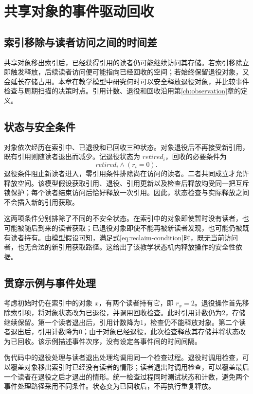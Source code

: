 \chapter{共享对象的事件驱动回收}
\label{ch:reclamation}

\section{索引移除与读者访问之间的时间差}
共享对象移出索引后，已经获得引用的读者仍可能继续访问其存储。若索引移除立即触发释放，后续读者访问便可能指向已经回收的空间；若始终保留退役对象，又会延长存储占用。本章在教学模型中研究何时可以安全释放退役对象，并比较事件检查与周期扫描的决策时点。引用计数、退役和回收沿用第\ref{ch:observation}章的定义。

\section{状态与安全条件}
对象依次经历在索引中、已退役和已回收三种状态。对象退役后不再接受新引用，既有引用则随读者退出而减少。记退役状态为 $retired_i$，回收的必要条件为
\begin{equation}
retired_i \land (r_i=0).
\label{eq:reclaim-condition}
\end{equation}
退役条件阻止新读者进入，零引用条件排除尚在访问的读者。二者共同成立才允许释放空间。该模型假设获取引用、退役、引用更新以及检查后释放均受同一把互斥锁保护；每个读者结束访问后恰好释放一次引用。因此，状态检查与实际释放之间不会插入新的引用获取。

这两项条件分别排除了不同的不安全状态。在索引中的对象即使暂时没有读者，也可能被随后到来的读者获取；已退役对象即使不能再被新读者发现，也可能仍被既有读者持有。由模型假设可知，满足式\ref{eq:reclaim-condition}时，既无当前访问者，也无合法的新引用获取路径。这给出了该教学状态机内释放操作的安全性依据。

\section{贯穿示例与事件处理}
考虑初始时仍在索引中的对象 $x$，有两个读者持有它，即 $r_x=2$。退役操作首先移除索引项，将对象状态改为已退役，并调用回收检查。此时引用计数仍为2，存储继续保留。第一个读者退出后，引用计数降为1，检查仍不能释放对象。第二个读者退出后，引用计数降为0；由于对象已经退役，此次检查释放其存储并将状态改为已回收。该示例描述事件次序，没有设定各事件间的时间间隔。

伪代码中的退役处理与读者退出处理均调用同一个检查过程。退役时调用检查，可以覆盖对象移出索引时已经没有读者的情形；读者退出时调用检查，可以覆盖最后一个读者在退役之后才退出的情形。统一检查过程同时测试状态和计数，避免两个事件处理路径采用不同条件。状态变为已回收后，不再执行重复释放。

